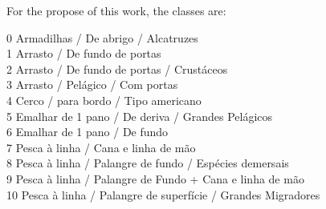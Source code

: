 For the propose of this work, the classes are: 

0    Armadilhas / De abrigo / Alcatruzes \\
1    Arrasto / De fundo de portas \\
2    Arrasto / De fundo de portas / Crustáceos\\
3    Arrasto / Pelágico / Com portas\\
4    Cerco / para bordo / Tipo americano\\
5    Emalhar de 1 pano / De deriva / Grandes Pelágicos\\
6    Emalhar de 1 pano / De fundo\\
7    Pesca à linha / Cana e linha de mão\\
8    Pesca à linha / Palangre de fundo / Espécies demersais\\
9    Pesca à linha / Palangre de Fundo + Cana e linha de mão\\
10    Pesca à linha / Palangre de superfície / Grandes Migradores



